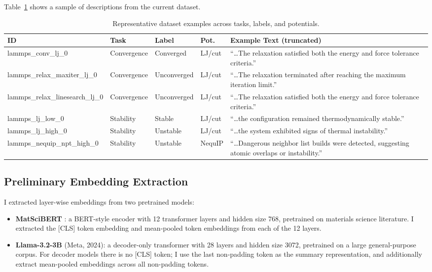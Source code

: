 \documentclass[11pt]{article}
\begin{document}
Table~\ref{tab:dataset} shows a sample of descriptions from the current dataset.

\begin{table}[h!]
\centering
\small
\caption{Representative dataset examples across tasks, labels, and potentials.}
\label{tab:dataset}
\renewcommand{\arraystretch}{1.3}
\begin{tabular}{p{3.2cm} p{1.9cm} p{2.0cm} p{1.4cm} p{5.0cm}}
\toprule
\textbf{ID} & \textbf{Task} & \textbf{Label} & \textbf{Pot.} & \textbf{Example Text (truncated)} \\
\midrule
\raggedright lammps\_conv\_lj\_0 & Convergence & Converged & LJ/cut & ``\ldots{}The relaxation satisfied both the energy and force tolerance criteria.'' \\[6pt]
\raggedright lammps\_relax\_\allowbreak maxiter\_lj\_0 & Convergence & Unconverged & LJ/cut & ``\ldots{}The relaxation terminated after reaching the maximum iteration limit.'' \\[6pt]
\raggedright lammps\_relax\_\allowbreak linesearch\_lj\_0 & Convergence & Unconverged & LJ/cut & ``\ldots{}The relaxation satisfied both the energy and force tolerance criteria.'' \\[6pt]
\raggedright lammps\_lj\_low\_0 & Stability & Stable & LJ/cut & ``\ldots{}the configuration remained thermodynamically stable.'' \\[6pt]
\raggedright lammps\_lj\_high\_0 & Stability & Unstable & LJ/cut & ``\ldots{}the system exhibited signs of thermal instability.'' \\[6pt]
\raggedright lammps\_nequip\_\allowbreak npt\_high\_0 & Stability & Unstable & NequIP & ``\ldots{}Dangerous neighbor list builds were detected, suggesting atomic overlaps or instability.'' \\
\bottomrule
\end{tabular}
\end{table}
\subsection{Preliminary Embedding Extraction}

I extracted layer-wise embeddings from two pretrained models:

\begin{itemize}
    \item \textbf{MatSciBERT} \cite{gupta2022}: a BERT-style encoder with 12 transformer layers and hidden size 768, pretrained on materials science literature. I extracted the [CLS] token embedding and mean-pooled token embeddings from each of the 12 layers.
    \item \textbf{Llama-3.2-3B} (Meta, 2024): a decoder-only transformer with 28 layers and hidden size 3072, pretrained on a large general-purpose corpus. For decoder models there is no [CLS] token; I use the last non-padding token as the summary representation, and additionally extract mean-pooled embeddings across all non-padding tokens.
\end{itemize}
\end{document}
